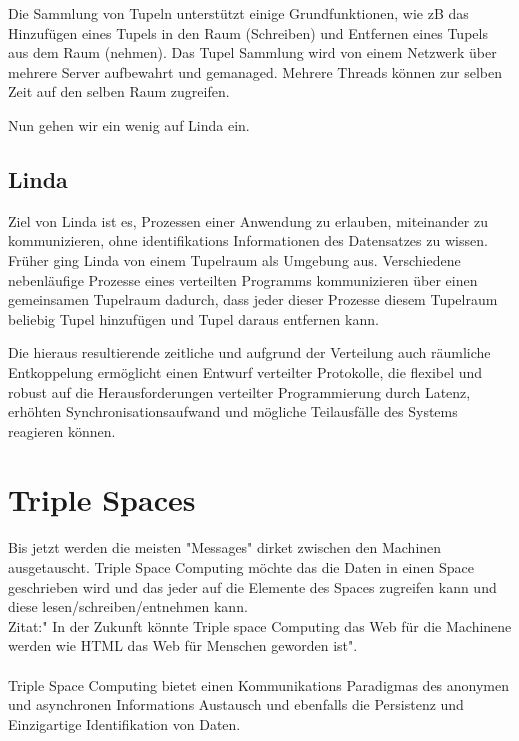 \documentclass[a4paper,12pt]{scrreprt}
\begin{document}
		
		Die Sammlung von Tupeln unterstützt einige Grundfunktionen, wie zB das Hinzufügen eines Tupels in den Raum (Schreiben) und Entfernen eines Tupels aus dem Raum (nehmen). Das Tupel Sammlung wird von einem Netzwerk über mehrere Server aufbewahrt und gemanaged. Mehrere Threads können  zur selben Zeit auf den selben Raum zugreifen.
		
		Nun gehen wir ein wenig auf Linda ein.
		
		\subsection{Linda}
		Ziel von Linda ist es, Prozessen einer Anwendung zu erlauben, miteinander zu kommunizieren, ohne identifikations Informationen des Datensatzes zu wissen. Früher ging Linda  von einem Tupelraum  als Umgebung aus. Verschiedene nebenläufige Prozesse eines verteilten Programms kommunizieren über einen gemeinsamen Tupelraum dadurch, dass jeder dieser Prozesse diesem Tupelraum beliebig Tupel hinzufügen und Tupel daraus entfernen kann.
		
		
		Die hieraus resultierende zeitliche und aufgrund der Verteilung auch räumliche Entkoppelung ermöglicht einen Entwurf verteilter Protokolle, die flexibel und robust auf die Herausforderungen verteilter Programmierung durch Latenz, erhöhten Synchronisationsaufwand und mögliche Teilausfälle des Systems reagieren können. %
		
		
		\section{Triple Spaces}
		
		Bis jetzt werden die meisten "Messages" dirket zwischen den Machinen ausgetauscht. Triple Space Computing möchte das die Daten in einen
		Space geschrieben wird und das jeder auf die Elemente des Spaces zugreifen kann und diese lesen/schreiben/entnehmen kann.\\
		Zitat:" In der Zukunft könnte Triple space Computing das Web für die Machinene werden wie HTML das Web für Menschen geworden ist".\\ \\
		Triple Space Computing bietet einen Kommunikations Paradigmas des anonymen und asynchronen Informations Austausch und ebenfalls die 
		Persistenz und Einzigartige Identifikation von Daten.\\
			
\end{document}
